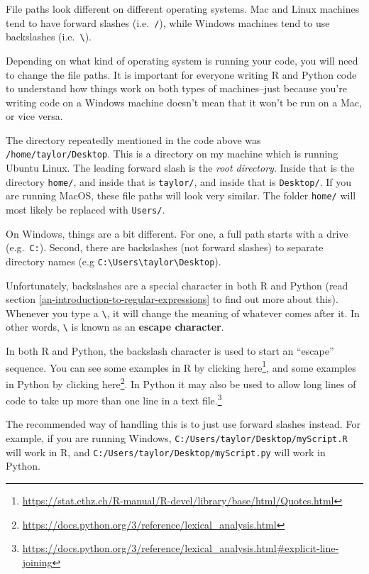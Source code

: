 \documentclass[
  12pt,
  krantz2]{krantz}
\renewcommand{\href}[2]{#2\footnote{\url{#1}}}
\begin{document}
File paths look different on different operating systems. Mac and Linux machines tend to have forward slashes (i.e.~\texttt{/}), while Windows machines tend to use backslashes (i.e.~\texttt{\textbackslash{}}).

Depending on what kind of operating system is running your code, you will need to change the file paths. It is important for everyone writing R and Python code to understand how things work on both types of machines--just because you're writing code on a Windows machine doesn't mean that it won't be run on a Mac, or vice versa.

The directory repeatedly mentioned in the code above was \texttt{/home/taylor/Desktop}. This is a directory on my machine which is running Ubuntu Linux. The leading forward slash is the \emph{root directory}. Inside that is the directory \texttt{home/}, and inside that is \texttt{taylor/}, and inside that is \texttt{Desktop/}. If you are running MacOS, these file paths will look very similar. The folder \texttt{home/} will most likely be replaced with \texttt{Users/}.

On Windows, things are a bit different. For one, a full path starts with a drive (e.g.~\texttt{C:}). Second, there are backslashes (not forward slashes) to separate directory names (e.g \texttt{C:\textbackslash{}Users\textbackslash{}taylor\textbackslash{}Desktop}).

Unfortunately, backslashes are a special character in both R and Python (read section \ref{an-introduction-to-regular-expressions} to find out more about this). Whenever you type a \texttt{\textbackslash{}}, it will change the meaning of whatever comes after it. In other words, \texttt{\textbackslash{}} is known as an \textbf{escape character}.

\begin{rmd-details}
In both R and Python, the backslash character is used to start an ``escape'' sequence. You can see some examples in R by clicking \href{https://stat.ethz.ch/R-manual/R-devel/library/base/html/Quotes.html}{here}, and some examples in Python by clicking \href{https://docs.python.org/3/reference/lexical_analysis.html}{here}. In Python it may also be used to \href{https://docs.python.org/3/reference/lexical_analysis.html\#explicit-line-joining}{allow long lines of code to take up more than one line in a text file.}

\end{rmd-details}

The recommended way of handling this is to just use forward slashes instead. For example, if you are running Windows, \texttt{C:/Users/taylor/Desktop/myScript.R} will work in R, and \texttt{C:/Users/taylor/Desktop/myScript.py} will work in Python.
\end{document}
